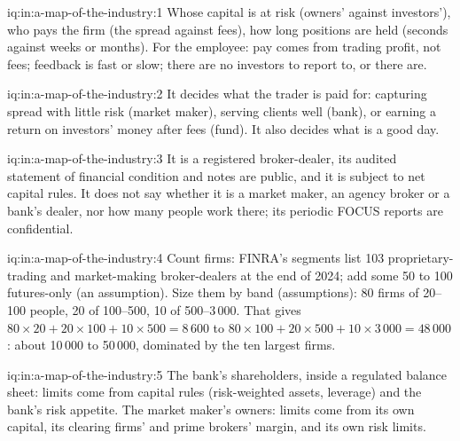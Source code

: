 \begin{solution}{iq:in:a-map-of-the-industry:1}
Whose capital is at risk (owners' against investors'), who pays the firm (the spread against fees), how long positions
are held (seconds against weeks or months). For the employee: pay comes from trading profit, not fees; feedback is fast
or slow; there are no investors to report to, or there are.
\end{solution}

\begin{solution}{iq:in:a-map-of-the-industry:2}
It decides what the trader is paid for: capturing spread with little risk (market maker), serving clients well (bank),
or earning a return on investors' money after fees (fund). It also decides what is a good day.
\end{solution}

\begin{solution}{iq:in:a-map-of-the-industry:3}
It is a registered broker-dealer, its audited statement of financial condition and notes are public, and it is subject
to net capital rules. It does not say whether it is a market maker, an agency broker or a bank's dealer, nor how many
people work there; its periodic FOCUS reports are confidential.
\end{solution}

\begin{solution}{iq:in:a-map-of-the-industry:4}
Count firms: FINRA's segments list 103 proprietary-trading and market-making broker-dealers at the end of 2024; add some
50 to 100 futures-only  (an assumption). Size them by band (assumptions): 80 firms of 20--100
people, 20 of 100--500, 10 of 500--3\,000. That gives $80\times20+20\times100+10\times500=8\,600$ to
$80\times100+20\times500+10\times3\,000=48\,000$: about 10\,000 to 50\,000, dominated by the ten largest firms.
\end{solution}

\begin{solution}{iq:in:a-map-of-the-industry:5}
The bank's shareholders, inside a regulated balance sheet: limits come from capital rules (risk-weighted assets,
leverage) and the bank's risk appetite. The market maker's owners: limits come from its own capital, its clearing firms'
and prime brokers' margin, and its own risk limits.
\end{solution}

